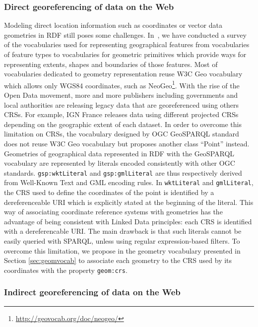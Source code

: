 \subsubsection{Direct georeferencing of data on the Web}
\label{sec:directgeo}
Modeling direct location information such as coordinates or vector data geometries in RDF still poses some challenges. In~\cite{Atemezing:TC12}, we have conducted a survey of the vocabularies used for representing geographical features from vocabularies of feature types to vocabularies for geometric primitives which provide ways for representing extents, shapes and boundaries of those features. 
Most of vocabularies dedicated to geometry representation reuse W3C Geo vocabulary which allows only WGS84 coordinates, such as NeoGeo\footnote{\url{http://geovocab.org/doc/neogeo/}}. With the rise of the Open Data movement, more and more publishers including governments and local authorities are releasing legacy data that are georeferenced using others CRSs. For example, IGN France releases data using different projected CRSs depending on the geographic extent of each dataset. In order to overcome this limitation on CRSs, the vocabulary designed by OGC GeoSPARQL standard  does not reuse W3C Geo vocabulary but proposes another class ``Point'' instead. Geometries of geographical data represented in RDF with the GeoSPARQL vocabulary are represented by literals encoded consistently with other OGC standards. \texttt{gsp:wktLiteral} and \texttt{gsp:gmlLiteral} are thus respectively derived from Well-Known Text and GML encoding rules. In \texttt{wktLiteral} and \texttt{gmlLiteral}, the CRS used to define the coordinates of the point is identified by a dereferenceable URI which is explicitly stated at the beginning of the literal. This way of associating coordinate reference systems with geometries has the advantage of being consistent with Linked Data principles: each CRS is identified with a dereferencable URI. The main drawback is that such literals cannot be easily queried with SPARQL, unless using regular expression-based filters.  To overcome this limitation, we propose in the geometry vocabulary presented in Section \ref{sec:geomvocab} to associate each geometry to the CRS used by its coordinates with the property \texttt{geom:crs}.

\subsubsection{Indirect georeferencing of data on the Web}
\label{sec:indirectgeo}

